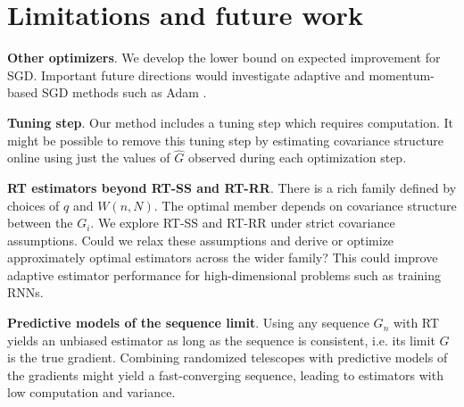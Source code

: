 
\section{Limitations and future work}
\textbf{Other optimizers}.
We develop the lower bound on expected improvement for SGD.
Important future directions would investigate adaptive and momentum-based SGD methods such as Adam \citep{kingma2014adam}.

\textbf{Tuning step}.
Our method includes a tuning step which requires computation.
It might be possible to remove this tuning step by estimating covariance structure online using just the values of $\hat{G}$ observed during each optimization step.

\textbf{RT estimators beyond RT-SS and RT-RR}.
There is a rich family defined by choices of $q$ and $W(n, N)$.
The optimal member depends on covariance structure between the $G_i$.
We explore RT-SS and RT-RR under strict covariance assumptions.
Could we relax these assumptions and derive or optimize approximately optimal estimators across the wider family?
This could improve adaptive estimator performance for high-dimensional problems such as training RNNs.

\textbf{Predictive models of the sequence limit}.
Using any sequence $G_n$ with RT yields an unbiased estimator as long as the sequence is consistent, i.e. its limit $G$ is the true gradient.
Combining randomized telescopes with predictive models of the gradients \citep{jaderberg2017decoupled, weber2019credit} might yield a fast-converging sequence, leading to estimators with low computation and variance.
